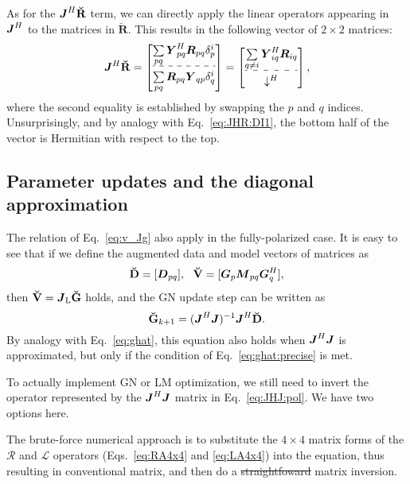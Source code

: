 \documentclass[useAMS,usenatbib]{mn2e}
\makeatletter
\newcommand{\mat}[1]{{\bmath{#1}}}
\newcommand{\JJ}{\mat{J}} %
\newcommand{\DD}{\mat{D}}
\newcommand{\MM}{\mat{M}}
\newcommand{\RR}{\mat{R}}
\newcommand{\GG}{\mat{G}}
\newcommand{\JHJ}{\JJ^H\JJ} %
\newcommand{\Matrix}[2]{\left [ \begin{array}{@{}#1@{}}#2\end{array} \right ]}
\newcommand{\Stack}[1]{\begin{array}{@{}c@{}}#1\end{array}}
\newcommand{\AUGx}[1]{\mathbf{\breve{#1}}}
\newcommand{\GGg}{\AUGx{G}}
\newcommand{\RRr}{\AUGx{R}}
\newcommand{\DDd}{\AUGx{D}}
\newcommand{\VVv}{\AUGx{V}}
\newcommand{\LEFT}{\mathrm{L}}
\numberwithin{equation}{section}
\providecommand{\DIFadd}[1]{{\protect\color{blue}\uwave{#1}}} %
\providecommand{\DIFdel}[1]{{\protect\color{red}\sout{#1}}}                      %
\providecommand{\DIFaddbegin}{} %
\providecommand{\DIFaddend}{} %
\providecommand{\DIFdelbegin}{} %
\providecommand{\DIFdelend}{} %
\makeatother
\begin{document}
As for the $\JJ^H\RRr$ term, we can directly apply the linear operators appearing in $\JJ^H$ 
to the matrices in $\RRr$. This results in the following vector of $2\times2$ matrices:
\begin{equation}
\JJ^H\RRr = \Matrix{c}{ 
\sum\limits_{pq} \YY^H_{pq} \RR_{pq} \delta^{i}_p  \\
\hdashline\\[-8pt]
\sum\limits_{pq} \RR_{pq} \YY_{qp} \delta^{i}_q 
} = \Matrix{c}{
\sum\limits_{q\ne i} \YY^H_{iq} \RR_{iq} \\
\hdashline\\[-8pt]
\downarrow^H
},
\end{equation}
where the second equality is established by swapping the $p$ and $q$ indices. Unsurprisingly, and by analogy with 
Eq.~\ref{eq:JHR:DI1}, the bottom half of the vector is Hermitian with respect to the top.

\subsection{Parameter updates and the diagonal approximation}

The relation of Eq.~\ref{eq:v_Jg} also apply in the fully-polarized case. It is easy to see that if we define the augmented 
data and model vectors of matrices as
\begin{equation}
\DDd = [ \DD_{pq} ],~~\VVv = [ \GG_p \MM_{pq} \GG_q^H ],
\end{equation}
then $\VVv = \JJ_\LEFT \GGg$ holds, and the GN update step can be written as
\begin{equation}
\label{eq:ghat:matrix}
\GGg_{k+1} = (\JHJ)^{-1} \JJ^H \DDd.
\end{equation}
By analogy with Eq.~\ref{eq:ghat}, this equation also holds when $\JHJ$ is approximated, but only if the condition of 
Eq.~\ref{eq:ghat:precise} is met.

To actually implement GN or LM optimization, we still need to invert the operator represented by the $\JHJ$ matrix in 
Eq.~\ref{eq:JHJ:pol}. We have two options here. 

The brute-force numerical approach is to substitute the 
$4\times4$ matrix forms of the $\mathcal{R}$ and $\mathcal{L}$ operators (Eqs.~\ref{eq:RA4x4} and \ref{eq:LA4x4}) into the 
equation, thus resulting in conventional matrix,
and then do a \DIFdelbegin \DIFdel{straightfoward }\DIFdelend \DIFaddbegin \DIFadd{straightforward }\DIFaddend matrix inversion. 
\end{document}
